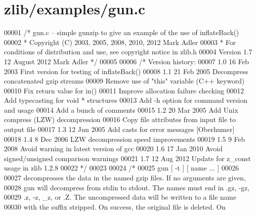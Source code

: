 \hypertarget{zlib_2examples_2gun_8c_source}{}\section{zlib/examples/gun.c}
\label{zlib_2examples_2gun_8c_source}

\begin{DoxyCode}
00001 \textcolor{comment}{/* gun.c -- simple gunzip to give an example of the use of inflateBack()}
00002 \textcolor{comment}{ * Copyright (C) 2003, 2005, 2008, 2010, 2012 Mark Adler}
00003 \textcolor{comment}{ * For conditions of distribution and use, see copyright notice in zlib.h}
00004 \textcolor{comment}{   Version 1.7  12 August 2012  Mark Adler */}
00005 
00006 \textcolor{comment}{/* Version history:}
00007 \textcolor{comment}{   1.0  16 Feb 2003  First version for testing of inflateBack()}
00008 \textcolor{comment}{   1.1  21 Feb 2005  Decompress concatenated gzip streams}
00009 \textcolor{comment}{                     Remove use of "this" variable (C++ keyword)}
00010 \textcolor{comment}{                     Fix return value for in()}
00011 \textcolor{comment}{                     Improve allocation failure checking}
00012 \textcolor{comment}{                     Add typecasting for void * structures}
00013 \textcolor{comment}{                     Add -h option for command version and usage}
00014 \textcolor{comment}{                     Add a bunch of comments}
00015 \textcolor{comment}{   1.2  20 Mar 2005  Add Unix compress (LZW) decompression}
00016 \textcolor{comment}{                     Copy file attributes from input file to output file}
00017 \textcolor{comment}{   1.3  12 Jun 2005  Add casts for error messages [Oberhumer]}
00018 \textcolor{comment}{   1.4   8 Dec 2006  LZW decompression speed improvements}
00019 \textcolor{comment}{   1.5   9 Feb 2008  Avoid warning in latest version of gcc}
00020 \textcolor{comment}{   1.6  17 Jan 2010  Avoid signed/unsigned comparison warnings}
00021 \textcolor{comment}{   1.7  12 Aug 2012  Update for z\_const usage in zlib 1.2.8}
00022 \textcolor{comment}{ */}
00023 
00024 \textcolor{comment}{/*}
00025 \textcolor{comment}{   gun [ -t ] [ name ... ]}
00026 \textcolor{comment}{}
00027 \textcolor{comment}{   decompresses the data in the named gzip files.  If no arguments are given,}
00028 \textcolor{comment}{   gun will decompress from stdin to stdout.  The names must end in .gz, -gz,}
00029 \textcolor{comment}{   .z, -z, \_z, or .Z.  The uncompressed data will be written to a file name}
00030 \textcolor{comment}{   with the suffix stripped.  On success, the original file is deleted.  On}

\end{DoxyCode}
